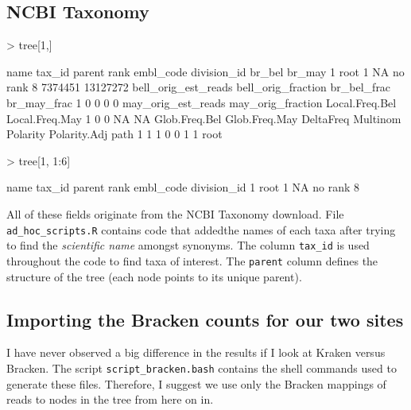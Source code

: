 \documentclass{article}
\begin{document}
\subsection{NCBI Taxonomy}
\begin{Schunk}
\begin{Sinput}
> tree[1,]
\end{Sinput}
\begin{Soutput}
  name tax_id parent    rank embl_code division_id  br_bel   br_may
1 root      1     NA no rank                     8 7374451 13127272
  bell_orig_est_reads bell_orig_fraction br_bel_frac br_may_frac
1                   0                  0           0           0
  may_orig_est_reads may_orig_fraction Local.Freq.Bel Local.Freq.May
1                  0                 0             NA             NA
  Glob.Freq.Bel Glob.Freq.May DeltaFreq Multinom Polarity Polarity.Adj path
1             1             1         0        0        1            1 root
\end{Soutput}
\begin{Sinput}
> tree[1, 1:6]
\end{Sinput}
\begin{Soutput}
  name tax_id parent    rank embl_code division_id
1 root      1     NA no rank                     8
\end{Soutput}
\end{Schunk}

All of these fields originate from the NCBI Taxonomy download. 
File {\tt ad\_hoc\_scripts.R} contains code that addedthe names of each taxa after trying to 
find the {\em scientific name} amongst synonyms. 
The column {\tt tax\_id} is used throughout the code to find taxa of interest.
The {\tt parent} column defines the structure of the tree (each node points to its unique parent).

\subsection{Importing the Bracken counts for our two sites}
I have never observed a big difference in the results if I look at Kraken versus Bracken.
The script {\tt script\_bracken.bash} contains the shell commands used to generate these files.
Therefore, I suggest we use only the Bracken mappings of reads to nodes in the tree from
here on in.
\end{document}
